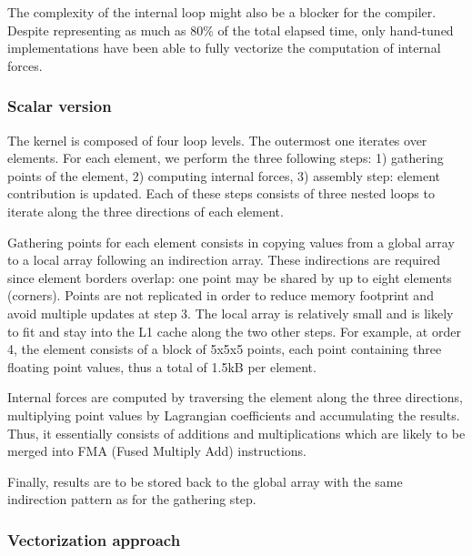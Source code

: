 \documentclass[a4paper,11pt]{article}
\begin{document}
The complexity of the internal loop might also be a blocker for the compiler.
Despite representing as much as 80\% of the total elapsed time, only hand-tuned
implementations have been able to fully vectorize the computation of internal
forces.

\subsubsection{Scalar version}

The kernel is composed of four loop levels. The outermost one iterates over
elements.  For each element, we perform the three following steps: 1) gathering
points of the element, 2) computing internal forces, 3) assembly step: element
contribution is updated. Each of these steps consists of three nested loops to
iterate along the three directions of each element.

Gathering points for each element consists in copying values from a global
array to a local array following an indirection array.  These indirections are
required since element borders overlap: one point may be shared by up to eight
elements (corners).  Points are not replicated in order to reduce memory
footprint and avoid multiple updates at step 3.  The local array is relatively
small and is likely to fit and stay into the L1 cache along the two other
steps.  For example, at order 4, the element consists of a block of 5x5x5
points, each point containing three floating point values, thus a total of
1.5kB per element.

Internal forces are computed by traversing the element along the three
directions, multiplying point values by Lagrangian coefficients and
accumulating the results.  Thus, it essentially consists of additions and
multiplications which are likely to be merged into FMA (Fused Multiply Add)
instructions.

Finally, results are to be stored back to the global array with the same
indirection pattern as for the gathering step.

\subsubsection{Vectorization approach}
\end{document}

